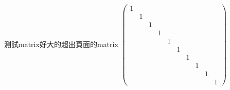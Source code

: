 \documentclass{beamer}
\begin{document}
\begin{frame}{測試matrix}{好大的超出頁面的matrix}
 $\left( 
\begin{array}{cccccccccc}
1 &  &  &  &  &  &  &  &  &  \\ 
& 1 &  &  &  &  &  &  &  &  \\ 
&  & 1 &  &  &  &  &  &  &  \\ 
&  &  & 1 &  &  &  &  &  &  \\ 
&  &  &  & 1 &  &  &  &  &  \\ 
&  &  &  &  & 1 &  &  &  &  \\ 
&  &  &  &  &  & 1 &  &  &  \\ 
&  &  &  &  &  &  & 1 &  &  \\ 
&  &  &  &  &  &  &  & 1 &  \\ 
&  &  &  &  &  &  &  &  & 1%
\end{array}%
\right) $
\end{frame}
\end{document}
